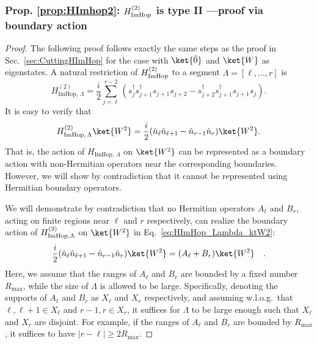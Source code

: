 \documentclass[prx,letterpaper,aps,superscriptaddress,floatfix,twocolumn,nofootinbib]{revtex4-2}
\theoremstyle{definition}
\newcommand{\HImHopLambda}{H_{\text{ImHop},\, \Lambda}}
\begin{document}
\subsubsection{Prop. \ref{prop:HImhop2}: $H^{(2)}_{\rm ImHop}$ is type II ---proof via boundary action}
\label{app:HImhop2}

\begin{proof}
%
The following proof follows exactly the same steps as the proof in Sec.~\ref{sec:CuttingHImHop} for the case with $\ket{\bar{0}}$ and $\ket{W}$ as eigenstates.
%
A natural restriction of $H_{\rm ImHop}^{(2)}$ to a segment $\Lambda = [\ell, \dots, r]$ is
\begin{equation}
\HImHopLambda^{(2)} = \frac{i}{2} \sum_{j=\ell}^{r - 2} (s_j^\dag s^\dag_{j+1} s_{j+1}s_{j+2} - s_{j+2}^\dag s_{j+1}^\dag s_{j+1} s_j).
\end{equation}
%
It is easy to verify that
\begin{equation}
\HImHopLambda^{(2)} \ket{W^2} = \frac{i}{2} (\hat{n}_\ell \hat{n}_{\ell+1} - \hat{n}_{r-1} \hat{n}_r) \ket{W^2}. 
\label{eq:HImHop_Lambda_ktW2}
\end{equation}
%
That is, the action of $\HImHopLambda$ on $\ket{W^2}$ can be represented as a boundary action with non-Hermitian operators near the corresponding boundaries.
%
However, we will show by contradiction that it cannot be represented using Hermitian boundary operators.
%

We will demonstrate by contradiction that no Hermitian operators $A_\ell$ and $B_r$, acting on finite regions near $\ell$ and $r$ respectively, can realize the boundary action of $H^{(2)}_{{\rm ImHop},\Lambda}$ on $\ket{W^2}$ in Eq.~\eqref{eq:HImHop_Lambda_ktW2}:
\begin{align}
     \frac{i}{2} (\hat{n}_\ell \hat{n}_{\ell+1} - \hat{n}_{r-1} \hat{n}_r) \ket{W^2}=(A_\ell+B_r)\ket{W^2}\quad.
     \label{eq:HImhop2LambdaAB}
\end{align}
Here, we assume that the ranges of $A_\ell$ and $B_r$ are bounded by a fixed number $R_{\text{max}}$, while the size of $\Lambda$ is allowed to be large.
%
Specifically, denoting the supports of $A_\ell$ and $B_r$ as $X_\ell$ and $X_r$ respectively, and assuming w.l.o.g.\ that $\ell, \ell+1 \in X_\ell$ and $r-1, r \in X_r$, it suffices for $\Lambda$ to be large enough such that $X_\ell$ and $X_r$ are disjoint. For example, if the ranges of $A_\ell$ and $B_r$ are bounded by $R_{\text{max}}$, it suffices to have $|r - \ell| \geq 2 R_{\text{max}}$.


\end{proof}
\end{document}

